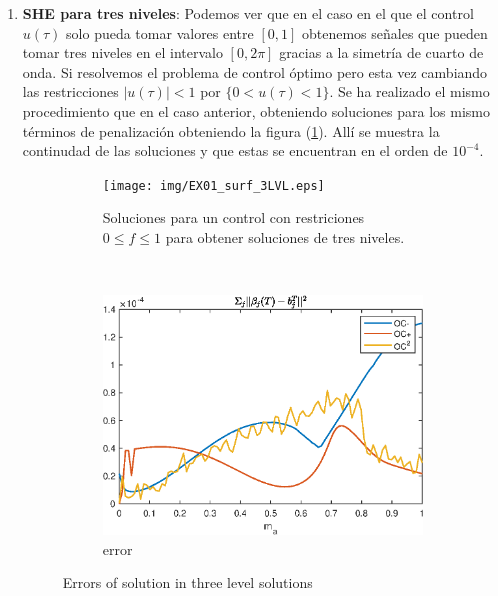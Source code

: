 \begin{enumerate}
     
    \item \textbf{SHE para tres niveles}: Podemos ver que en el caso en el que el control $u(\tau)$ solo pueda tomar valores entre $[0,1]$ obtenemos señales que pueden tomar tres niveles en el intervalo $[0,2\pi]$ gracias a la simetría de cuarto de onda. Si resolvemos el problema de control óptimo pero esta vez cambiando las restricciones $|u(\tau)|<1$ por $\{0<u(\tau)<1\}$. Se ha realizado el mismo procedimiento que en el caso anterior, obteniendo soluciones para los mismo términos de penalización obteniendo la figura (\ref{ex3LVL}). Allí se muestra la continudad de las soluciones y que estas se encuentran en el orden de $10^{-4}$.
    



    \begin{figure}
        \centering
        \begin{subfigure}[b]{\textwidth}
            \centering
            \texttt{[image: img/EX01\_surf\_3LVL.eps]}
            \caption{Soluciones para un control  con restriciones $0 \leq f\leq 1$ para obtener soluciones de tres niveles.}
        \end{subfigure} 
        \hfill \\
        \begin{subfigure}[b]{0.4\textwidth}
            \centering
            \includegraphics[scale=0.6]{img/EX01_3LVL.eps}
            \caption{error}
        \end{subfigure}
        \caption{Errors of solution in three level solutions}
        \label{ex3LVL}
    \end{figure}
    

\end{enumerate}

